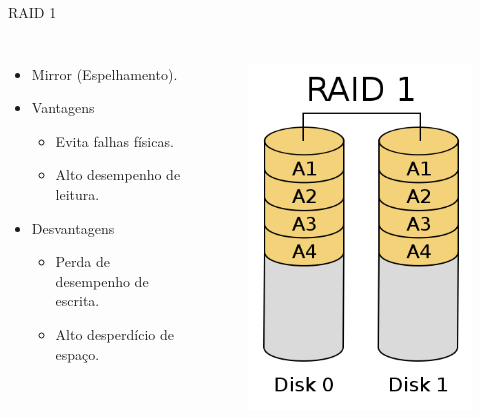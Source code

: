 \begin{frame}{RAID 1}
	\begin{columns}
		\begin{itemize}
			\item Mirror (Espelhamento).
			\item Vantagens
			\begin{itemize}
				\item Evita falhas físicas.
				\item Alto desempenho de leitura.
			\end{itemize}
			\item Desvantagens
			\begin{itemize}
				\item Perda de desempenho de escrita.
				\item Alto desperdício de espaço.
			\end{itemize}
		\end{itemize}
		
		\begin{figure}
			\includegraphics[width=\textwidth]{imagens/RAID_1}
			\label{fig:exemplo}
		\end{figure}
		
	\end{columns}
\end{frame}

